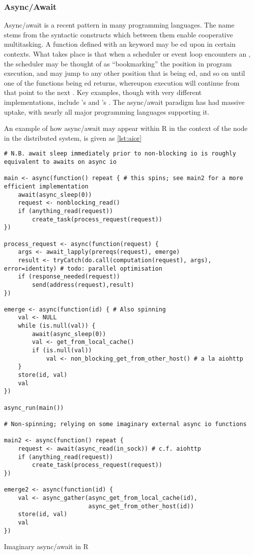 \subsubsection{Async/Await}

Async/await is a recent pattern in many programming languages.
The name stems from the syntactic constructs which between them enable cooperative multitasking.
A function defined with an  keyword may be ed upon in certain contexts.
What takes place is that when a scheduler or event loop encounters an , the scheduler may be thought of as ``bookmarking'' the position in program execution, and may jump to any other position that is being ed, and so on until one of the functions being ed returns, whereupon execution will continue from that point to the next .
Key examples, though with very different implementations, include 's  and 's .
The async/await paradigm has had massive uptake, with nearly all major programming languages supporting it.

An example of how async/await may appear within R in the context of the node in the distributed system, is given as \cref{lst:aior}

\begin{listing}
\begin{verbatim}
# N.B. await sleep immediately prior to non-blocking io is roughly equivalent to awaits on async io

main <- async(function() repeat { # this spins; see main2 for a more efficient implementation
    await(async_sleep(0))
    request <- nonblocking_read()
    if (anything_read(request))
        create_task(process_request(request))
})

process_request <- async(function(request) {
    args <- await_lapply(prereqs(request), emerge)
    result <- tryCatch(do.call(computation(request), args), error=identity) # todo: parallel optimisation
    if (response_needed(request))
        send(address(request),result)
})

emerge <- async(function(id) { # Also spinning
    val <- NULL
    while (is.null(val)) {
        await(async_sleep(0))
        val <- get_from_local_cache()
        if (is.null(val))
            val <- non_blocking_get_from_other_host() # a la aiohttp
    }
    store(id, val)
    val
})

async_run(main())

# Non-spinning; relying on some imaginary external async io functions

main2 <- async(function() repeat {
    request <- await(async_read(in_sock)) # c.f. aiohttp
    if (anything_read(request))
        create_task(process_request(request))
})

emerge2 <- async(function(id) {
    val <- async_gather(async_get_from_local_cache(id),
                        async_get_from_other_host(id))
    store(id, val)
    val
})
\end{verbatim}
\caption{Imaginary async/await in R}
\label{lst:aior}
\end{listing}


